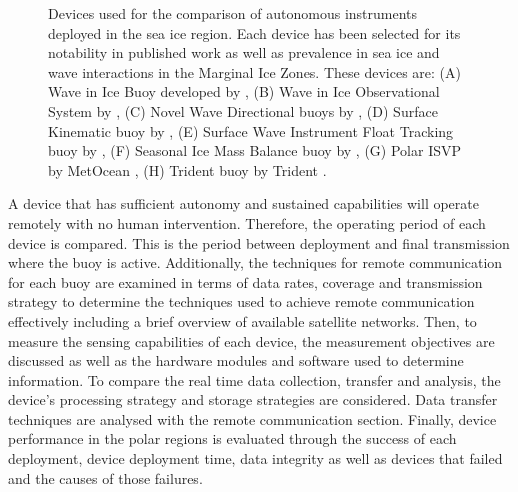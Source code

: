 \begin{figure}[H]
\begin{subfigure}[b]{0.24\textwidth}
		\label{fig:UptempO}
	\end{subfigure}%
	\hfill
	\begin{subfigure}[b]{0.24\textwidth}
		\centering
		\label{fig:trident}
	\end{subfigure}%
	\hfill
	\caption{ Devices used for the comparison of autonomous instruments deployed in the sea ice region. Each device has been selected for its notability in published work as well as prevalence in sea ice and wave interactions in the Marginal Ice Zones. These devices are: (A) Wave in Ice Buoy developed by \textcite{rabault2017measurements}, (B) Wave in Ice Observational System by \textcite{kohout2015device}, (C) Novel Wave Directional buoys by \textcite{doble2017robust}, (D) Surface Kinematic buoy by \textcite{guimaraes2018surface}, (E) Surface Wave Instrument Float Tracking buoy by \textcite{thomson2012wave}, (F) Seasonal Ice Mass Balance buoy by \textcite{polashenski2011seasonal,meng2014optimal}, (G) Polar ISVP  by MetOcean \cite{uptempo}, (H) Trident buoy by Trident \cite{trident}.}
	\label{fig:buoys}
\end{figure}


A device that has sufficient autonomy and sustained capabilities will operate remotely with no human intervention. Therefore, the operating period of each device is compared. This is the period between deployment and final transmission where the buoy is active. Additionally, the techniques for remote communication for each buoy are examined in terms of data rates, coverage and transmission strategy to determine the techniques used to achieve remote communication effectively including a brief overview of available satellite networks. Then, to measure the sensing capabilities of each device, the measurement objectives are discussed as well as the hardware modules and software used to determine information. To compare the real time data collection, transfer and analysis, the device's processing strategy and storage strategies are considered. Data transfer techniques are analysed with the remote communication section. Finally, device performance in the polar regions is evaluated through the success of each deployment, device deployment time, data integrity as well as devices that failed and the causes of those failures.

